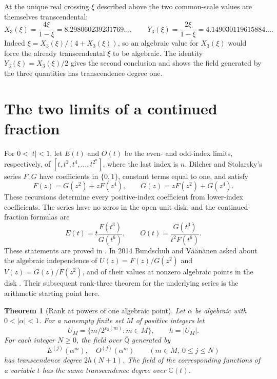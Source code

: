 \documentclass[11pt,a4paper]{article}
\newtheorem{theorem}{Theorem}[section]
\theoremstyle{definition}
\theoremstyle{remark}
\numberwithin{equation}{section}
\begin{document}
At the unique real crossing $\xi$ described above the two common-scale
values are themselves transcendental:
\[
 X_3(\xi)=\frac{4\xi}{1-\xi}=8.298060239231769\ldots,\qquad
 Y_3(\xi)=\frac{2\xi}{1-\xi}=4.149030119615884\ldots .
\]
Indeed $\xi=X_3(\xi)/(4+X_3(\xi))$, so an algebraic value for
$X_3(\xi)$ would force the already transcendental $\xi$ to be
algebraic. The identity $Y_3(\xi)=X_3(\xi)/2$ gives the second
conclusion and shows the field generated by the three quantities has
transcendence degree one.

\section{The two limits of a continued fraction}
\label{sec:ds}

For \(0<|t|<1\), let \(E(t)\) and \(O(t)\) be the even- and odd-index limits, respectively, of
\([t,t^2,t^4,\ldots,t^{2^n}]\), where the last index is \(n\).
Dilcher and Stolarsky's series \(F,G\) have coefficients in \(\{0,1\}\), constant terms equal to one, and satisfy
\begin{equation}
 F(z)=G(z^2)+zF(z^4),\qquad G(z)=zF(z^2)+G(z^4).
 \label{eq:ds-rec}
\end{equation}
These recursions determine every positive-index coefficient from lower-index coefficients. The series have no zeros in the open unit disk, and the continued-fraction formulas are
\begin{equation}
 E(t)=t\frac{F(t^3)}{G(t^6)},\qquad
 O(t)=\frac{G(t^3)}{t^2F(t^6)}.
 \label{eq:ds-limits}
\end{equation}
These statements are proved in \cite[Sections 5--6]{ds09}. In 2014 Bundschuh and V\"a\"an\"anen asked about the algebraic independence of \(U(z)=F(z)/G(z^2)\) and \(V(z)=G(z)/F(z^2)\), and of their values at nonzero algebraic points in the disk \cite[Problem 1.15]{dsbv14}. Their subsequent rank-three theorem for the underlying series \cite[Theorems 1.2--1.3]{dsbv15} is the arithmetic starting point here.

\begin{theorem}[Rank at powers of one algebraic point]
\label{thm:ds-rank}
Let \(\alpha\) be algebraic with \(0<|\alpha|<1\). For a nonempty finite set \(M\) of positive integers let
\[
 U_M=\{m/2^{v_2(m)}:m\in M\},\qquad h=|U_M|.
\]
For each integer \(N\geq0\), the field over \(\overline{\mathbb Q}\) generated by
\[
 E^{(j)}(\alpha^m),\quad O^{(j)}(\alpha^m)
 \qquad(m\in M,\ 0\leq j\leq N)
\]
has transcendence degree \(2h(N+1)\). The field of the corresponding functions of a variable \(t\) has the same transcendence degree over \(\mathbb C(t)\).
\end{theorem}
\end{document}
